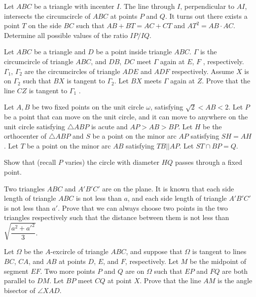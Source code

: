\documentclass[11pt]{scrartcl}
\begin{document}
\begin{problem}[5363953658134647103]
Let $ABC$ be a triangle with incenter $I$. The line through $I$, perpendicular to $AI$, intersects the circumcircle of $ABC$ at points $P$ and $Q$. It turns out there exists a point $T$ on the side $BC$ such that $AB + BT = AC + CT$ and $AT^2 =  AB \cdot AC$. Determine all possible values of the ratio $IP/IQ$.
\end{problem}
\begin{problem}[6209707374283278028]
Let $ABC$ be a triangle and $D$ be a point inside triangle $ABC$. $\Gamma$ is the circumcircle of triangle $ABC$, and $DB$, $DC$ meet $\Gamma$ again at $E$, $F$ , respectively. $\Gamma_1$, $\Gamma_2$ are the circumcircles of triangle $ADE$ and $ADF$ respectively. Assume $X$ is on $\Gamma_2$ such that $BX$ is tangent to $\Gamma_2$. Let $BX$ meets $\Gamma$ again at $Z$. Prove that the line $CZ$ is tangent to $\Gamma_1$ .
\end{problem}
\begin{problem}[308110166188097]
Let $A,B$ be two fixed points on the unit circle $\omega$, satisfying $\sqrt{2} < AB < 2$. Let $P$ be a point that can move on the unit circle, and it can move to anywhere on the unit circle satisfying $\triangle ABP$ is acute and $AP>AB>BP$. Let $H$ be the orthocenter of $\triangle ABP$ and $S$ be a point on the minor arc $AP$ satisfying $SH=AH$. Let $T$ be a point on the minor arc $AB$ satisfying $TB || AP$. Let $ST\cap BP = Q$.

Show that (recall $P$ varies) the circle with diameter $HQ$ passes through a fixed point.
\end{problem}
\begin{problem}[3838489129977355762]
Two triangles $ABC$ and $A'B'C'$ are on the plane. It is known that each side length of triangle $ABC$ is not less than $a$, and each side length of triangle $A'B'C'$ is not less than $a'$. Prove that we can always choose two points in the two triangles respectively such that the distance between them is not less than $\sqrt{\dfrac{a^2+a'^2}{3}}$.
\end{problem}
\begin{problem}[6566259136811987209]
	Let $\Omega$ be the $A$-excircle of triangle $ABC$, and suppose that $\Omega$ is tangent to lines $BC$, $CA$, and $AB$ at points $D$, $E$, and $F$, respectively. Let $M$ be the midpoint of segment $EF$. Two more points $P$ and $Q$ are on $\Omega$ such that $EP$ and $FQ$ are both parallel to $DM$. Let $BP$ meet $CQ$ at point $X$. Prove that the line $AM$ is the angle bisector of $\angle XAD$.
\end{problem}
\end{document}
